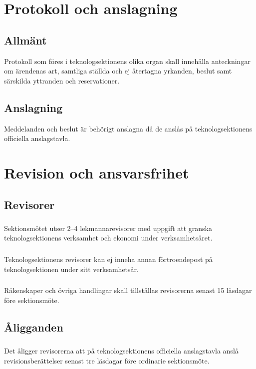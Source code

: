 \documentclass[a4paper]{dtek}
\begin{document}
\section{Protokoll och anslagning}
\subsection{Allmänt}
Protokoll som föres i teknologsektionens olika organ skall innehålla anteckningar om ärendenas art, samtliga ställda och ej återtagna yrkanden, beslut samt särskilda yttranden och reservationer.
\subsection{Anslagning}
Meddelanden och beslut är behörigt anslagna då de anslås på teknologsektionens officiella anslagstavla.
\newpage

\section{Revision och ansvarsfrihet}
\subsection{Revisorer}
\subsubsection{}
Sektionsmötet utser 2–4 lekmannarevisorer med uppgift att granska teknologsektionens verksamhet och ekonomi under verksamhetsåret.
\subsubsection{}
Teknologsektionens revisorer kan ej inneha annan förtroendepost på teknologsektionen under sitt verksamhetsår.
\subsubsection{}
Räkenskaper och övriga handlingar skall tillställas revisorerna senast 15 läsdagar före sektionsmöte.
\subsection{Åligganden}
\subsubsection{}
Det åligger revisorerna att på teknologsektionens officiella anslagstavla anslå revisionsberättelser senast tre läsdagar före ordinarie sektionsmöte.
\end{document}
